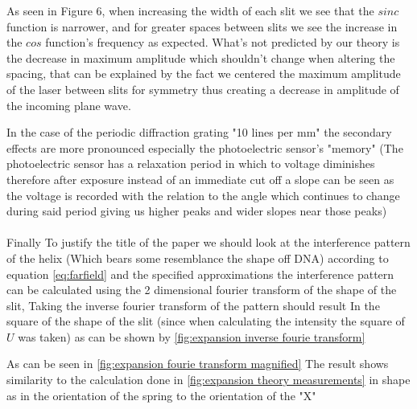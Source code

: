 As seen in Figure 6, when increasing the width of each slit we see that the $sinc$ function is narrower, and for greater spaces between slits we see the increase in the $cos$ function's frequency as expected.
What's not predicted by our theory is the decrease in maximum amplitude which shouldn't change when altering the spacing,
that can be explained by the fact we centered the maximum amplitude of the laser between slits for symmetry thus creating a decrease in amplitude of the incoming plane wave.


\newpage
In the case of the periodic diffraction grating "10 lines per mm" the secondary effects are more pronounced especially
the photoelectric sensor's "memory" (The photoelectric sensor has a relaxation period in which to voltage diminishes
therefore after exposure instead of an immediate cut off a slope can be seen as the voltage is recorded with the relation
to the angle which continues to change during said period giving us higher peaks and wider slopes near those peaks)\\
\\
Finally To justify the title of the paper we should look at the interference pattern of the helix (Which bears some resemblance the shape off DNA)
according to equation \eqref{eq:farfield} and the specified approximations the interference pattern can be calculated using
the 2 dimensional fourier transform of the shape of the slit, Taking the inverse fourier transform of the pattern should result
In the square of the shape of the slit (since when calculating the intensity the square of $U$ was taken)
as can be shown by \ref{fig:expansion inverse fourie transform}


As can be seen in \ref{fig:expansion fourie transform magnified} The result shows similarity to the calculation done in \ref{fig:expansion theory measurements}
in shape as in the orientation of the spring to the orientation of the "X"